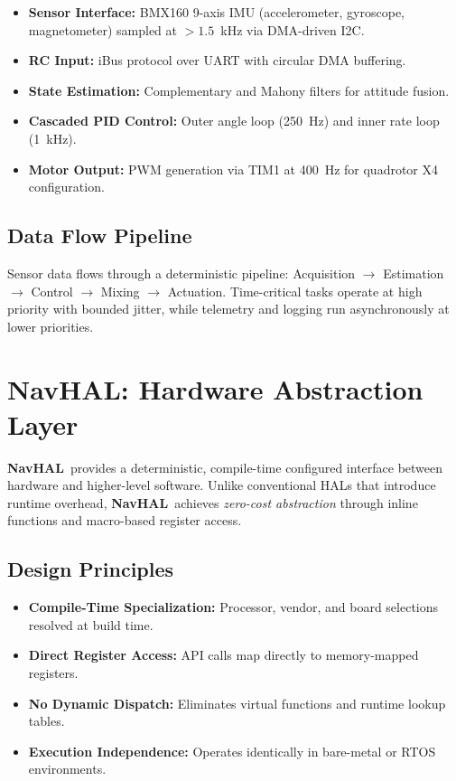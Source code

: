 \documentclass[11pt]{article}
\newcommand{\navhal}{\textbf{NavHAL}}
\begin{document}
\begin{itemize}[leftmargin=*]
    \item \textbf{Sensor Interface:} BMX160 9-axis IMU (accelerometer, gyroscope, magnetometer) sampled at $>1.5$~kHz via DMA-driven I2C.
    \item \textbf{RC Input:} iBus protocol over UART with circular DMA buffering.
    \item \textbf{State Estimation:} Complementary and Mahony filters for attitude fusion.
    \item \textbf{Cascaded PID Control:} Outer angle loop (250~Hz) and inner rate loop (1~kHz).
    \item \textbf{Motor Output:} PWM generation via TIM1 at 400~Hz for quadrotor X4 configuration.
\end{itemize}

\subsection{Data Flow Pipeline}

Sensor data flows through a deterministic pipeline: Acquisition $\rightarrow$ Estimation $\rightarrow$ Control $\rightarrow$ Mixing $\rightarrow$ Actuation. Time-critical tasks operate at high priority with bounded jitter, while telemetry and logging run asynchronously at lower priorities.

\section{NavHAL: Hardware Abstraction Layer}

\navhal~provides a deterministic, compile-time configured interface between hardware and higher-level software. Unlike conventional HALs that introduce runtime overhead, \navhal~achieves \textit{zero-cost abstraction} through inline functions and macro-based register access.

\subsection{Design Principles}

\begin{itemize}[leftmargin=*]
    \item \textbf{Compile-Time Specialization:} Processor, vendor, and board selections resolved at build time.
    \item \textbf{Direct Register Access:} API calls map directly to memory-mapped registers.
    \item \textbf{No Dynamic Dispatch:} Eliminates virtual functions and runtime lookup tables.
    \item \textbf{Execution Independence:} Operates identically in bare-metal or RTOS environments.
\end{itemize}
\end{document}
